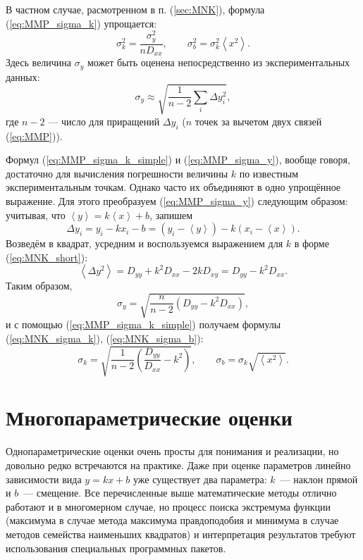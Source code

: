 В частном случае, расмотренном в п. (\ref{sec:MNK}),
формула (\ref{eq:MMP_sigma_k}) упрощается:
\begin{equation}
\boxed{\sigma_{k}^{2}=\frac{\sigma_{y}^{2}}{nD_{xx}},\qquad\sigma_{b}^{2}=\sigma_{k}^{2}\left\langle x^{2}\right\rangle }.\label{eq:MMP_sigma_k_simple}
\end{equation}
Здесь величина $\sigma_{y}$ может быть оценена непосредственно из
экспериментальных данных:
\begin{equation}
\sigma_{y}\approx\sqrt{\frac{1}{n-2}\sum_{i}\Delta y_{i}^{2}},\label{eq:MMP_sigma_y}
\end{equation}
где $n-2$ --- число 
для приращений $\Delta y_{i}$ ($n$ точек за вычетом двух связей
(\ref{eq:MMP})).

Формул (\ref{eq:MMP_sigma_k_simple}) и (\ref{eq:MMP_sigma_y}),
вообще говоря, достаточно для вычисления погрешности величины $k$
по известным экспериментальным точкам. Однако часто их объединяют
в одно упрощённое выражение. Для этого преобразуем (\ref{eq:MMP_sigma_y})
следующим образом: учитывая, что $\left\langle y\right\rangle =k\left\langle x\right\rangle +b$,
запишем
\[
\Delta y_{i}=y_{i}-kx_{i}-b=\left(y_{i}-\left\langle y\right\rangle \right)-k\left(x_{i}-\left\langle x\right\rangle \right).
\]
Возведём в квадрат, усредним и воспользуемся выражением для $k$ в
форме (\ref{eq:MNK_short}):
\[
\left\langle \Delta y^{2}\right\rangle =D_{yy}+k^{2}D_{xx}-2kD_{xy}=D_{yy}-k^{2}D_{xx}.
\]
Таким образом,
\[
\sigma_{y}=\sqrt{\frac{n}{n-2}\left(D_{yy}-k^{2}D_{xx}\right)},
\]
и с помощью (\ref{eq:MMP_sigma_k_simple}) получаем формулы (\ref{eq:MNK_sigma_k}),
(\ref{eq:MNK_sigma_b}):
\[
\boxed{\sigma_{k}=\sqrt{\frac{1}{n-2}\left(\frac{D_{yy}}{D_{xx}}-k^{2}\right)},\qquad\sigma_{b}=\sigma_{k}\sqrt{\left\langle x^{2}\right\rangle }}.
\]

\section{Многопараметрические оценки}

    Однопараметрические оценки очень просты для понимания и реализации, но
довольно редко встречаются на практике. Даже при оценке параметров
линейно зависимости вида $y = k x + b$ уже существует два параметра:
$k$~--- наклон прямой и $b$~--- смещение. Все перечисленные выше
математические методы отлично работают и в многомерном случае, но
процесс поиска экстремума функции (максимума в случае метода максимума
правдоподобия и минимума в случае методов семейства наименьших
квадратов) и интерпретация результатов требуют использования специальных
программных пакетов.


